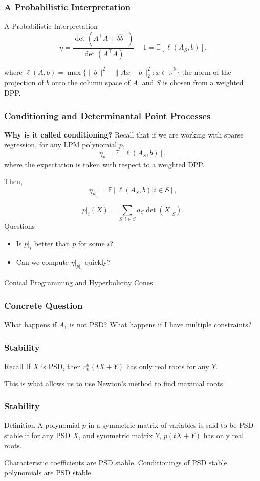 \documentclass{beamer}
\newcommand{\R}{\mathbb{R}}
\newcommand{\E}{\mathbb{E}}
\begin{document}
\begin{frame}
    \frametitle{A Probabilistic Interpretation}
    \begin{block}{A Probabilistic Interpretation}
    \[
        \eta = \frac{\det(A^{\intercal}A+\hat{b}\hat{b}^{\intercal})}{\det(A^{\intercal}A)} - 1 = \E[\ell(A_S, b)].
    \]
    \end{block}
    where $\ell(A, b) = \max \{\|b\|^2 - \|Ax - b\|_2^2 : x \in \R^k\}$ the norm of the projection of $b$ onto the column space of $A$, and $S$ is chosen from a weighted DPP.
\end{frame}
\begin{frame}
    \frametitle{Conditioning and Determinantal Point Processes}
    \textbf{Why is it called conditioning?}
    Recall that if we are working with sparse regression, for any LPM polynomial $p$,
    \[
        \eta_p = \E[\ell(A_S, b)],
    \]
    where the expectation is taken with respect to a weighted DPP.

    Then,
    \[
        \eta_{p|_i} = \E[\ell(A_S, b)|i \in S],
    \]
\end{frame}
\begin{frame}
    \[
        p|_i(X) = \sum_{S : i \in S} a_S \det(X|_S).
    \]
    \pause
    Questions
    \begin{itemize}
        \item Is $p|_i$ better than $p$ for some $i$?
        \item Can we compute $\eta|_{p|_i}$ quickly?
    \end{itemize}
\end{frame}
\begin{frame}
    \centering
    \huge
    {\color{gray}Conical Programming and Hyperbolicity Cones}
\end{frame}
\begin{frame}
\frametitle{Concrete Question}
What happens if $A_1$ is not PSD? What happens if I have multiple constraints?
\end{frame}
\begin{frame}
\frametitle{Stability}
\begin{block}{Recall}
    If $X$ is PSD, then $c_n^k(tX+Y)$ has only real roots for any $Y$.
\end{block}
This is what allows us to use Newton's method to find maximal roots.
\end{frame}
\begin{frame}
\frametitle{Stability}
\begin{block}{Definition}
    A polynomial $p$ in a symmetric matrix of variables is said to be PSD-stable if for any PSD $X$, and symmetric matrix $Y$, $p(tX+Y)$ has only real roots.
\end{block}
\pause
Characteristic coefficients are PSD stable.
\pause 
Conditionings of PSD stable polynomials are PSD stable.
\end{frame}
\end{document}
